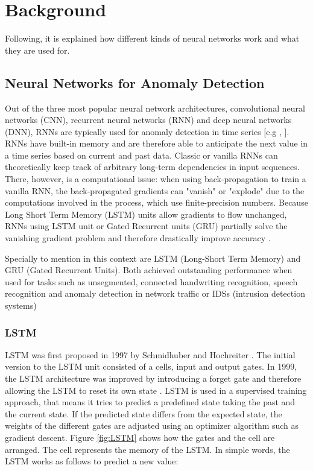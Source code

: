 \section{Background} \label{background}

Following, it is explained how different kinds of neural networks work and what they are used for.

\subsection{Neural Networks for Anomaly Detection} \label{NN}

Out of the three most popular neural network architectures, convolutional neural networks (CNN), recurrent neural networks (RNN) and deep neural networks (DNN), RNNs are typically used for anomaly detection in time series [e.g \parencite{Malhotra2015}, \parencite{Verner2019}]. RNNs have built-in memory and are therefore able to anticipate the next value in a time series based on current and past data. Classic or vanilla RNNs can theoretically keep track of arbitrary long-term dependencies in input sequences. There, however, is a computational issue: when using back-propagation to train a vanilla RNN, the back-propagated gradients can "vanish" or "explode" due to the computations involved in the process, which use finite-precision numbers. Because Long Short Term Memory (LSTM) units allow gradients to flow unchanged, RNNs using LSTM unit or Gated Recurrent units (GRU) partially solve the vanishing gradient problem and therefore drastically improve accuracy \parencite{Hochreiter1997}.

Specially to mention in this context are LSTM (Long-Short Term Memory) and GRU (Gated Recurrent Units). Both achieved outstanding performance when used for tasks such as unsegmented, connected handwriting recognition, speech recognition and anomaly detection in network traffic or IDSs (intrusion detection systems) \parencite{JunyoungChung2014}

\subsubsection{LSTM} \label{LSTM}
LSTM was first proposed in 1997 by Schmidhuber and Hochreiter \parencite{Hochreiter1997}. The initial version to the LSTM unit consisted of a cells, input and output gates. In 1999, the LSTM architecture was improved by introducing a forget gate and therefore allowing the LSTM to reset its own state \parencite{Gers2000}. LSTM is used in a supervised training approach, that means it tries to predict a predefined state taking the past and the current state. If the predicted state differs from the expected state, the weights of the different gates are adjusted using an optimizer algorithm such as gradient descent. Figure \ref{fig:LSTM} shows how the gates and the cell are arranged. The cell represents the memory of the LSTM. In simple words, the LSTM works as follows to predict a new value: 


